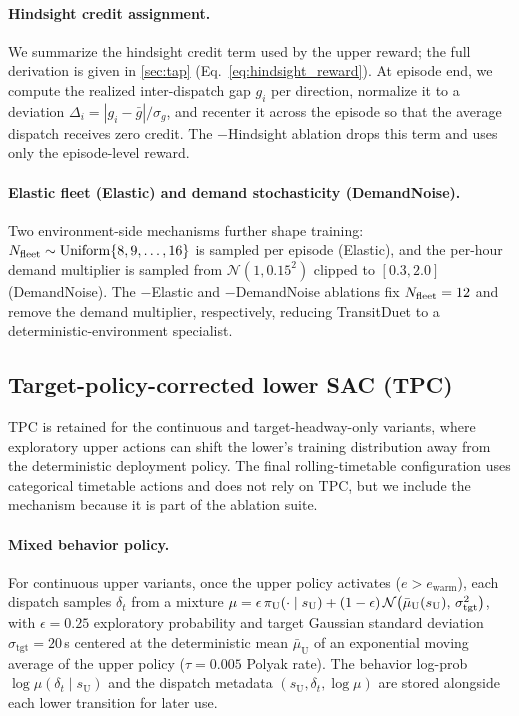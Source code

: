 \paragraph{Hindsight credit assignment.}
We summarize the hindsight credit term used by the upper reward; the full derivation is given in \cref{sec:tap} (Eq.~\ref{eq:hindsight_reward}). At episode end, we compute the realized inter-dispatch gap $g_i$ per direction, normalize it to a deviation $\Delta_i = |g_i - \bar{g}|/\sigma_g$, and recenter it across the episode so that the average dispatch receives zero credit. The $-$Hindsight ablation drops this term and uses only the episode-level reward.

\paragraph{Elastic fleet (Elastic) and demand stochasticity (DemandNoise).}
Two environment-side mechanisms further shape training: $N_{\mathrm{fleet}} \sim \mathrm{Uniform}\{8, 9, \ldots, 16\}$ is sampled per episode (Elastic), and the per-hour demand multiplier is sampled from $\mathcal{N}(1, 0.15^2)$ clipped to $[0.3, 2.0]$ (DemandNoise). The $-$Elastic and $-$DemandNoise ablations fix $N_{\mathrm{fleet}} = 12$ and remove the demand multiplier, respectively, reducing TransitDuet to a deterministic-environment specialist.

\subsection{Target-policy-corrected lower SAC (TPC)}
\label{sec:tpc}

TPC is retained for the continuous and target-headway-only variants, where exploratory upper actions can shift the lower's training distribution away from the deterministic deployment policy. The final rolling-timetable configuration uses categorical timetable actions and does not rely on TPC, but we include the mechanism because it is part of the ablation suite.

\paragraph{Mixed behavior policy.}
For continuous upper variants, once the upper policy activates ($e > e_{\mathrm{warm}}$), each dispatch samples $\delta_t$ from a mixture
$\mu = \epsilon \, \pi_{\mathrm{U}}(\cdot \mid s_{\mathrm U}) + (1-\epsilon) \, \mathcal{N}\!\left(\bar{\mu}_{\mathrm U}(s_{\mathrm U}),\, \sigma_{\mathrm{tgt}}^2\right)$,
with $\epsilon = 0.25$ exploratory probability and target Gaussian standard deviation $\sigma_{\mathrm{tgt}} = 20$\,s centered at the deterministic mean $\bar{\mu}_{\mathrm U}$ of an exponential moving average of the upper policy ($\tau = 0.005$ Polyak rate).
The behavior log-prob $\log \mu(\delta_t \mid s_{\mathrm U})$ and the dispatch metadata $(s_{\mathrm U}, \delta_t, \log \mu)$ are stored alongside each lower transition for later use.


